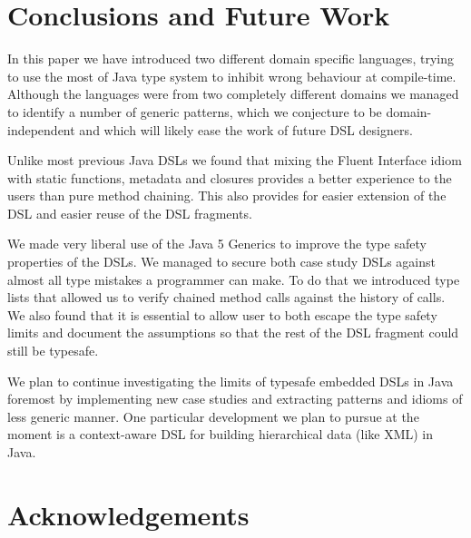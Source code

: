 \documentclass{sig-alternate}
\begin{document}

\section{Conclusions and Future Work}

In this paper we have introduced two different domain specific languages, trying to use the most of Java type system to inhibit wrong behaviour at compile-time. Although the languages were from two completely different domains we managed to identify a number of generic patterns, which we conjecture to be domain-independent and which will likely ease the work of future DSL designers.

Unlike most previous Java DSLs we found that mixing the Fluent Interface idiom with static functions, metadata and closures provides a better experience to the users than pure method chaining. This also provides for easier extension of the DSL and easier reuse of the DSL fragments. 

We made very liberal use of the Java 5 Generics to improve the type safety properties of the DSLs. We managed to secure both case study DSLs against almost all type mistakes a programmer can make. To do that we introduced type lists that allowed us to verify chained method calls against the history of calls. We also found that it is essential to allow user to both escape the type safety limits and document the assumptions so that the rest of the DSL fragment could still be typesafe.

We plan to continue investigating the limits of typesafe embedded DSLs in Java foremost by implementing new case studies and extracting patterns and idioms of less generic manner. One particular development we plan to pursue at the moment is a context-aware DSL for building hierarchical data (like XML) in Java. 

\section{Acknowledgements}
\end{document}

